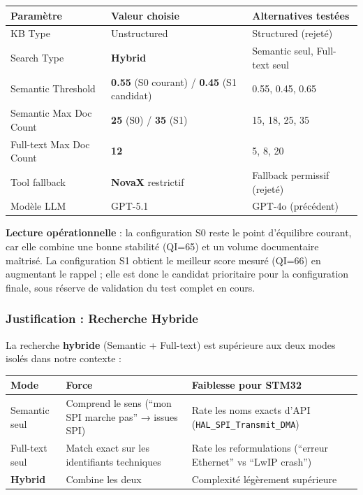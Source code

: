 \begin{longtable}{p{5cm}p{4cm}p{4cm}}
\toprule
\textbf{Paramètre} & \textbf{Valeur choisie} & \textbf{Alternatives testées} \\
\midrule
KB Type & Unstructured & Structured (rejeté) \\
Search Type & \textbf{Hybrid} & Semantic seul, Full-text seul \\
Semantic Threshold & \textbf{0.55} (S0 courant) / \textbf{0.45} (S1 candidat) & 0.55, 0.45, 0.65 \\
Semantic Max Doc Count & \textbf{25} (S0) / \textbf{35} (S1) & 15, 18, 25, 35 \\
Full-text Max Doc Count & \textbf{12} & 5, 8, 20 \\
Tool fallback & \textbf{NovaX} restrictif & Fallback permissif (rejeté) \\
Modèle LLM & GPT-5.1 & GPT-4o (précédent) \\
\bottomrule
\end{longtable}

\textbf{Lecture opérationnelle} : la configuration S0 reste le point d'équilibre courant, car elle combine une bonne stabilité (QI=65) et un volume documentaire maîtrisé. La configuration S1 obtient le meilleur score mesuré (QI=66) en augmentant le rappel ; elle est donc le candidat prioritaire pour la configuration finale, sous réserve de validation du test complet en cours.

\subsubsection{Justification : Recherche Hybride}

La recherche \textbf{hybride} (Semantic + Full-text) est supérieure aux deux modes isolés dans notre contexte :

\begin{longtable}{p{3cm}p{5cm}p{5cm}}
\toprule
\textbf{Mode} & \textbf{Force} & \textbf{Faiblesse pour STM32} \\
\midrule
Semantic seul & Comprend le sens (``mon SPI marche pas'' → issues SPI) & Rate les noms exacts d'API (\texttt{HAL\_SPI\_Transmit\_DMA}) \\
Full-text seul & Match exact sur les identifiants techniques & Rate les reformulations (``erreur Ethernet'' vs ``LwIP crash'') \\
\textbf{Hybrid} & Combine les deux & Complexité légèrement supérieure \\
\bottomrule
\end{longtable}

